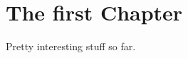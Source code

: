 \chapter{The first Chapter}\label{ch:One}
\begin{theorem}
Pretty interesting stuff so far.
\end{theorem}